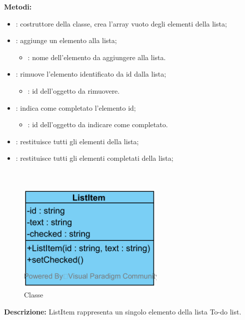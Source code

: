 \textbf{Metodi:}
\begin{itemize}
	\item {}: costruttore della classe, crea l'array vuoto degli elementi della lista;
	\item {}: aggiunge un elemento alla lista;
	\begin{itemize}
		\item {}: nome dell'elemento da aggiungere alla lista.
	\end{itemize}
	\item {}: rimuove l'elemento identificato da id dalla lista;
	\begin{itemize}
		\item {}: id dell'oggetto da rimuovere.
	\end{itemize}
	\item {}: indica come completato l'elemento id;
	\begin{itemize}
		\item {}: id dell'oggetto da indicare come completato.
	\end{itemize}
	\item {}: restituisce tutti gli elementi della lista;
	\item {}: restituisce tutti gli elementi completati della lista;
\end{itemize}

\paragraph[::ListItem]{\class}\mbox{}\\ \label{\class}
\begin{figure}[H]
	\centering
	\includegraphics[width=7cm]{./diagrammi/todo/todolistitem.png}
	\caption{Classe \class}
\end{figure}
\textbf{Descrizione:}
ListItem rappresenta un singolo elemento della lista To-do list.

